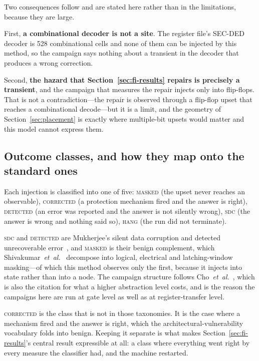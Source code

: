 \documentclass[11pt,a4paper]{article}
\begin{document}
Two consequences follow and are stated here rather than in the
limitations, because they are large.

First, \textbf{a combinational decoder is not a site}. The register
file's SEC-DED decoder is 528 combinational cells and none of them can be
injected by this method, so the campaign says nothing about a transient
in the decoder that produces a wrong correction.

Second, \textbf{the hazard that Section~\ref{sec:fi-results} repairs is
precisely a transient}, and the campaign that measures the repair injects
only into flip-flops. That is not a contradiction---the repair is
observed through a flip-flop upset that reaches a combinational
decode---but it is a limit, and the geometry of
Section~\ref{sec:placement} is exactly where multiple-bit upsets would
matter and this model cannot express them.

\subsection{Outcome classes, and how they map onto the standard ones}

Each injection is classified into one of five: \textsc{masked} (the
upset never reaches an observable), \textsc{corrected} (a protection
mechanism fired and the answer is right), \textsc{detected} (an error was
reported and the answer is not silently wrong), \textsc{sdc} (the answer
is wrong and nothing said so), \textsc{hang} (the run did not terminate).

\textsc{sdc} and \textsc{detected} are Mukherjee's silent data corruption
and detected unrecoverable error~\cite{mukherjee2003,mukherjee2008}, and
\textsc{masked} is their benign complement, which
Shivakumar~\emph{et~al.}~\cite{shivakumar2002} decompose into logical,
electrical and latching-window masking---of which this method observes
only the first, because it injects into state rather than into a node.
The campaign structure follows Cho~\emph{et~al.}~\cite{cho2013}, which is
also the citation for what a higher abstraction level costs, and is the
reason the campaigns here are run at gate level as well as at
register-transfer level.

\textsc{corrected} is the class that is not in those taxonomies. It is
the case where a mechanism fired and the answer is right, which the
architectural-vulnerability vocabulary folds into benign. Keeping it
separate is what makes Section~\ref{sec:fi-results}'s central result
expressible at all: a class where everything went right by every measure
the classifier had, and the machine restarted.
\end{document}
